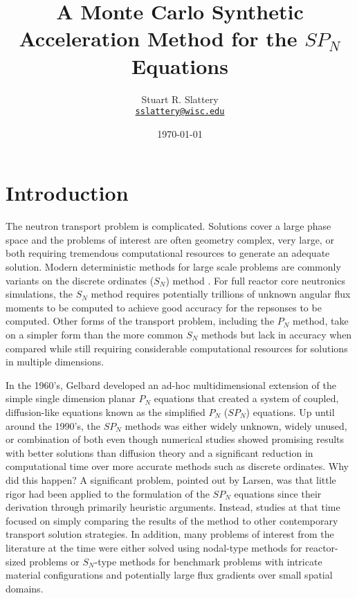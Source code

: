 \documentclass[letterpaper,12pt]{article}
\author{Stuart R. Slattery
  \\ \href{mailto:sslattery@wisc.edu}{\texttt{sslattery@wisc.edu}}
}
\date{\today}
\title{A Monte Carlo Synthetic Acceleration Method for the $SP_N$ Equations}
\begin{document}
\maketitle

\section{Introduction}
\label{sec:introduction}
The neutron transport problem is complicated. Solutions cover a large
phase space and the problems of interest are often geometry complex,
very large, or both requiring tremendous computational resources to
generate an adequate solution. Modern deterministic methods for large
scale problems are commonly variants on the discrete ordinates ($S_N$)
method \cite{evans_denovo:_2010}. For full reactor core neutronics
simulations, the $S_N$ method requires potentially trillions of
unknown angular flux moments to be computed to achieve good accuracy
for the repsonses to be computed. Other forms of the transport
problem, including the $P_N$ method, take on a simpler form than the
more common $S_N$ methods but lack in accuracy when compared while
still requiring considerable computational resources for solutions in
multiple dimensions.

In the 1960's, Gelbard developed an ad-hoc multidimensional extension
of the simple single dimension planar $P_N$ equations that created a
system of coupled, diffusion-like equations known as the simplified
$P_N$ ($SP_N$) equations. Up until around the 1990's, the $SP_N$
methods was either widely unknown, widely unused, or combination of
both even though numerical studies showed promising results with
better solutions than diffusion theory and a significant reduction in
computational time over more accurate methods such as discrete
ordinates. Why did this happen? A significant problem, pointed out by
Larsen, was that little rigor had been applied to the formulation of
the $SP_N$ equations since their derivation through primarily
heuristic arguments. Instead, studies at that time focused on simply
comparing the results of the method to other contemporary transport
solution strategies. In addition, many problems of interest from the
literature at the time were either solved using nodal-type methods for
reactor-sized problems or $S_N$-type methods for benchmark problems
with intricate material configurations and potentially large flux
gradients over small spatial domains.
\end{document}
